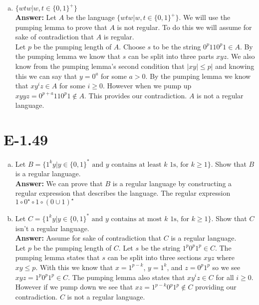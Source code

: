 \documentclass{article}
\begin{document}
\begin{enumerate}[a.]
\item $\{wtw | w,t \in \{0,1\}^+\}$\\
{\bf Answer: } Let $A$ be the language $\{wtw | w,t \in \{0,1\}^+\}$. We will use the pumping lemma to prove that $A$ is not regular. To do this we will assume for sake of contradiction that $A$ is regular. \\
Let $p$ be the pumping length of $A$. Choose $s$ to be the string $0^p110^p1 \in A$. By the pumping lemma we know that $s$ can be split into three parts $xyz$. We also know from the pumping lemma's second condition that $|xy| \leq p|$ and knowing this we can say that $y = 0^a$ for some $a>0$. By the pumping lemma we know that $xy^iz \in A$ for some $i \geq 0$. However when we pump up $xyyz = 0^{p+a}110^p1 \notin A$. This provides our contradiction. $A$ is not a regular language. 

\end{enumerate}

\section*{E-1.49}

\begin{enumerate}[a.]
\item Let $B=\{1^ky|y \in \{0,1\}^* \mbox{\ and $y$ contains at least $k$ 1s,
for $k \geq 1$}\}$.
Show that $B$ is a regular language.\\
{\bf Answer: } We can prove that $B$ is a regular language by constructing a regular expression that describes the language. The regular expression $1 \circ 0^{\star} \circ 1 \circ (0 \cup 1)^{\star}$

\item Let $C=\{1^ky|y \in \{0,1\}^* \mbox{\ and $y$ contains at most $k$ 1s,
for $k \geq 1$}\}$.
Show that $C$ isn't a regular language.\\
{\bf Answer: } Assume for sake of contradiction that $C$ is a regular language.  \\
Let $p$ be the pumping length of $C$. Let $s$ be the string $1^p0^p1^p \in C$. The pumping lemma states that $s$ can be split into three sections $xyz$ where $xy \leq p$. With this we know that $x=1^{p-k}$, $y=1^k$, and $z=0^p1^p$ so we see $xyz = 1^p0^p1^p \in C$. The pumping lemma also states that $xy^iz \in C$ for all $i \geq 0$. However if we pump down we see that $xz = 1^{p-k}0^p1^p \notin C$ providing our contradiction. $C$ is not a regular language. 
\end{enumerate}
\end{document}

